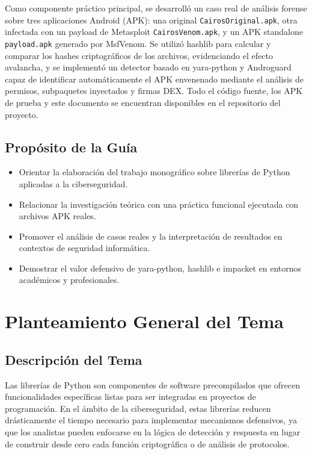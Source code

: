 \documentclass[12pt,a4paper]{article}
\begin{document}
Como componente práctico principal, se desarrolló un caso real de
análisis forense sobre tres aplicaciones Android (APK): una original
\texttt{CairosOriginal.apk}, otra infectada con un payload de Metasploit
\texttt{CairosVenom.apk}, y un APK standalone \texttt{payload.apk}
generado por MsfVenom. Se utilizó hashlib para calcular y comparar los
hashes criptográficos de los archivos, evidenciando el efecto avalancha,
y se implementó un detector basado en yara-python y Androguard capaz de
identificar automáticamente el APK envenenado mediante el análisis de
permisos, subpaquetes inyectados y firmas DEX. Todo el código fuente,
los APK de prueba y este documento se encuentran disponibles en el
repositorio del proyecto.

\subsection{Propósito de la Guía}

\begin{itemize}
\item Orientar la elaboración del trabajo monográfico sobre librerías de
  Python aplicadas a la ciberseguridad.
\item Relacionar la investigación teórica con una práctica funcional
  ejecutada con archivos APK reales.
\item Promover el análisis de casos reales y la interpretación de resultados
  en contextos de seguridad informática.
\item Demostrar el valor defensivo de yara-python, hashlib e impacket en
  entornos académicos y profesionales.
\end{itemize}

\section{Planteamiento General del Tema}

\subsection{Descripción del Tema}

Las librerías de Python son componentes de software precompilados que
ofrecen funcionalidades específicas listas para ser integradas en
proyectos de programación. En el ámbito de la ciberseguridad, estas
librerías reducen drásticamente el tiempo necesario para implementar
mecanismos defensivos, ya que los analistas pueden enfocarse en la
lógica de detección y respuesta en lugar de construir desde cero cada
función criptográfica o de análisis de protocolos.
\end{document}
